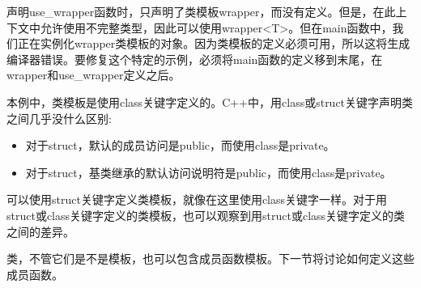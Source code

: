 声明use\_wrapper函数时，只声明了类模板wrapper，而没有定义。但是，在此上下文中允许使用不完整类型，因此可以使用wrapper<T>。但在main函数中，我们正在实例化wrapper类模板的对象。因为类模板的定义必须可用，所以这将生成编译器错误。要修复这个特定的示例，必须将main函数的定义移到末尾，在wrapper和use\_wrapper定义之后。

本例中，类模板是使用class关键字定义的。C++中，用class或struct关键字声明类之间几乎没什么区别:

\begin{itemize}
\item 
对于struct，默认的成员访问是public，而使用class是private。

\item 
对于struct，基类继承的默认访问说明符是public，而使用class是private。
\end{itemize}

可以使用struct关键字定义类模板，就像在这里使用class关键字一样。对于用struct或class关键字定义的类模板，也可以观察到用struct或class关键字定义的类之间的差异。

类，不管它们是不是模板，也可以包含成员函数模板。下一节将讨论如何定义这些成员函数。

















